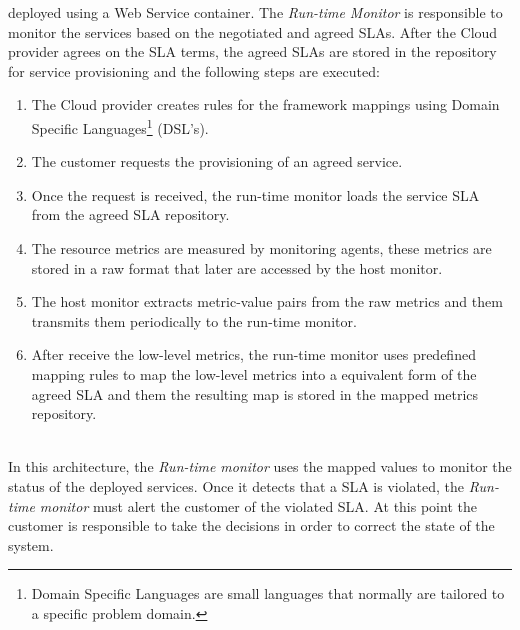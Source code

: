 deployed using a Web Service container. The \textit{Run-time Monitor} is responsible to monitor the services based on the negotiated and agreed SLAs. After the Cloud provider agrees on the SLA terms, the agreed SLAs are stored in the repository for
service provisioning and the following steps are executed:
\begin{enumerate}
  \item The Cloud provider creates rules for the framework mappings using Domain Specific Languages\footnote{Domain Specific Languages are small languages that normally are tailored to a specific problem domain.} (DSL's).
  \item The customer requests the provisioning of an agreed service.
  \item Once the request is received, the run-time monitor loads the service SLA from the agreed SLA repository.
  \item The resource metrics are measured by monitoring agents, these metrics are stored in a raw format that later are accessed by the host monitor.
  \item The host monitor extracts metric-value pairs from the raw metrics and them transmits them periodically to the run-time monitor.
  \item After receive the low-level metrics, the run-time monitor uses predefined mapping rules to map the low-level metrics into a equivalent form of the agreed SLA and them the resulting map is stored in the mapped metrics repository.
\end{enumerate}\\
In this architecture, the \textit{Run-time monitor} uses the mapped values to monitor the status of the deployed services. Once it detects that a SLA is violated, the \textit{Run-time monitor} must alert the customer of the violated SLA.
At this point the customer is responsible to take the decisions in order to correct the state of the system.
